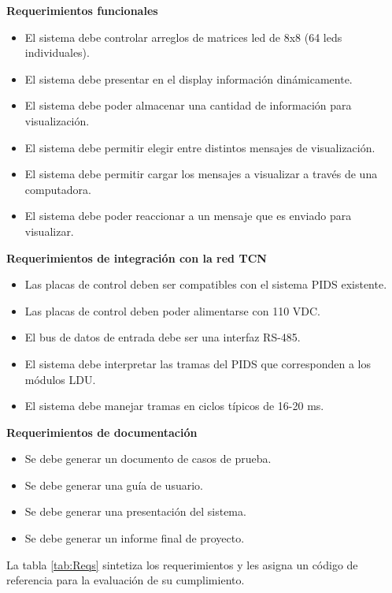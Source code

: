 \textbf{Requerimientos funcionales}

\begin{itemize}
\item El sistema debe controlar arreglos de matrices led de 8x8 (64 leds individuales).
\item El sistema debe presentar en el display información dinámicamente.
\item El sistema debe poder almacenar una cantidad de información para visualización.
\item El sistema debe permitir elegir entre distintos mensajes de visualización.
\item El sistema debe permitir cargar los mensajes a visualizar a través de una computadora.
\item El sistema debe poder reaccionar a un mensaje que es enviado para visualizar.
\end{itemize}

\textbf{Requerimientos de integración con la red TCN
}\begin{itemize}
\item Las placas de control deben ser compatibles con el sistema PIDS existente.
\item Las placas de control deben poder alimentarse con 110 VDC.
\item El bus de datos de entrada debe ser una interfaz RS-485.
\item El sistema debe interpretar las tramas del PIDS que corresponden a los módulos LDU.
\item El sistema debe manejar tramas en ciclos típicos de 16-20 ms.
\end{itemize}

\textbf{Requerimientos de documentación
}\begin{itemize}
\item Se debe generar un documento de casos de prueba.
\item Se debe generar una guía de usuario.
\item Se debe generar una presentación del sistema.
\item Se debe generar un informe final de proyecto.
\end{itemize}

La tabla \ref{tab:Reqs} sintetiza los requerimientos y les asigna un código de referencia para la evaluación de su cumplimiento.
	
